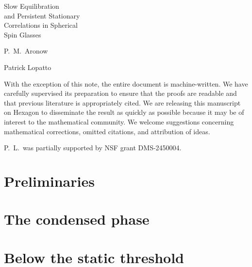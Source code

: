 \documentclass[12pt,oneside,openany]{book}
\numberwithin{equation}{chapter}
\theoremstyle{plain}
\theoremstyle{definition}
\theoremstyle{remark}
\newcommand{\npptitlepage}[2]{%
  \hypersetup{pageanchor=false}%
  \begin{titlepage}
  \centering\normalfont
  \vspace*{1.7in}
  {\large\strut\par}
  \vspace{1.05in}
  {\fontsize{28}{35}\selectfont #1\par}
  \vspace{1.1in}
  {\Large\def\\{\par\vspace{10pt}}#2\par}
  \vfill
  \end{titlepage}%
  \hypersetup{pageanchor=true}}
\begin{document}
\frontmatter
\npptitlepage{Slow Equilibration\\ and Persistent Stationary\\ Correlations in Spherical\\ Spin Glasses}{P.\ M.\ Aronow\\ Patrick Lopatto}
\begin{authorsnote}
With the exception of this note, the entire
document is machine-written. We have carefully supervised its preparation
to ensure that the proofs are readable and that
previous literature is appropriately cited. We are
releasing this manuscript on Hexagon to disseminate the result as quickly as
possible because it may be of interest to the mathematical
community.
We welcome suggestions concerning mathematical corrections, omitted citations, and attribution of ideas.

P.\ L.\ was partially supported by NSF grant DMS-2450004.
\end{authorsnote}
\begin{abstractpage}

\end{abstractpage}
\tableofcontents
\mainmatter




\part{Preliminaries}\label{part:prelim}


\part{The condensed phase}\label{part:condensed}











\part{Below the static threshold}\label{part:prestatic}






\appendix


\backmatter

\setlength{\bibsep}{3pt plus 1pt minus 1pt}


\end{document}

